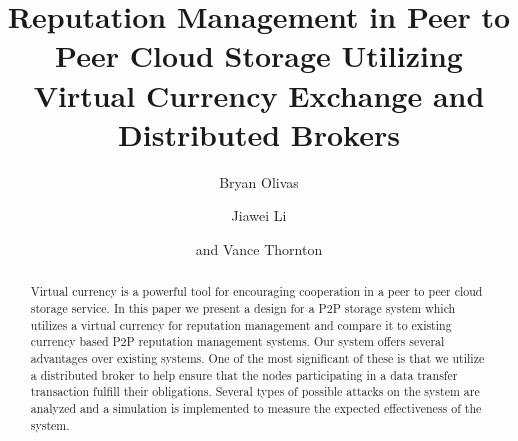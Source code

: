 \documentclass[%
				10pt,
        final,
        notitlepage,
        narroweqnarray,
        inline,
        twoside,
        ]{ieee}
\begin{document}
\title[Reputation Management with Distributed Brokers]{%
       Reputation Management  in Peer to Peer Cloud Storage Utilizing Virtual Currency Exchange and Distributed Brokers}


\author{%
      Bryan Olivas
    \and
      Jiawei Li
    \and
      and Vance Thornton
}




\maketitle               

\begin{abstract}
Virtual currency is a powerful tool for encouraging cooperation in a peer to peer cloud storage service.  In this paper we present a design for a P2P storage system which utilizes a virtual currency for reputation management and compare it to existing currency based P2P reputation management systems.  Our system offers several advantages over existing systems.  One of the most significant of these is that we utilize a distributed broker to help ensure that the nodes participating in a data transfer transaction fulfill their obligations.  Several types of possible attacks on the system are analyzed and a simulation is implemented to measure the expected effectiveness of the system.
\end{abstract}
\end{document}
